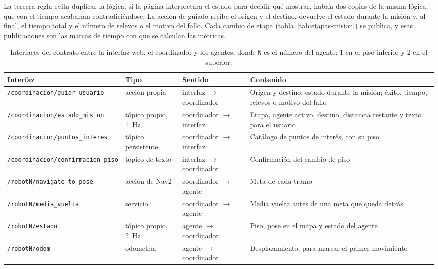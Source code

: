 La tercera regla evita duplicar la lógica: si la página interpretara el estado para decidir qué mostrar, habría dos copias de la misma lógica, que con el tiempo acabarían contradiciéndose. La acción de guiado recibe el origen y el destino, devuelve el estado durante la misión y, al final, el tiempo total y el número de relevos o el motivo del fallo. Cada cambio de etapa (tabla~\ref{tab:etapas-mision}) se publica, y esas publicaciones son las marcas de tiempo con que se calculan las métricas.

\begin{table}[H]
  \centering\footnotesize{}
  \caption{Interfaces del contrato entre la interfaz web, el coordinador y los agentes, donde \texttt{N} es el número del agente: 1 en el piso inferior y 2 en el superior.}
  \label{tab:contrato}
  \begin{tabular}{@{}>{\scriptsize\raggedright\arraybackslash}p{}>{\raggedright\arraybackslash}p{}>{\raggedright\arraybackslash}p{}>{\raggedright\arraybackslash}p{}@{}}
    \toprule
    \footnotesize\textbf{Interfaz} & \textbf{Tipo} & \textbf{Sentido} & \textbf{Contenido} \\ \midrule
    \texttt{/coordinacion/guiar\_usuario} & acción propia & interfaz $\rightarrow$ coordinador & Origen y destino; estado durante la misión; éxito, tiempo, relevos o motivo del fallo \\
    \texttt{/coordinacion/estado\_mision} & tópico propio, 1~Hz & coordinador $\rightarrow$ interfaz & Etapa, agente activo, destino, distancia restante y texto para el usuario \\
    \texttt{/coordinacion/puntos\_interes} & tópico persistente & coordinador $\rightarrow$ interfaz & Catálogo de puntos de interés, con su piso \\
    \texttt{/coordinacion/confirmacion\_piso} & tópico de texto & interfaz $\rightarrow$ coordinador & Confirmación del cambio de piso \\
    \texttt{/robotN/navigate\_to\_pose} & acción de Nav2 & coordinador $\rightarrow$ agente & Meta de cada tramo \\
    \texttt{/robotN/media\_vuelta} & servicio & coordinador $\rightarrow$ agente & Media vuelta antes de una meta que queda detrás \\
    \texttt{/robotN/estado} & tópico propio, 2~Hz & agente $\rightarrow$ coordinador & Piso, pose en el mapa y estado del agente \\
    \texttt{/robotN/odom} & odometría & agente $\rightarrow$ coordinador & Desplazamiento, para marcar el primer movimiento \\ \bottomrule
  \end{tabular}
\end{table}

